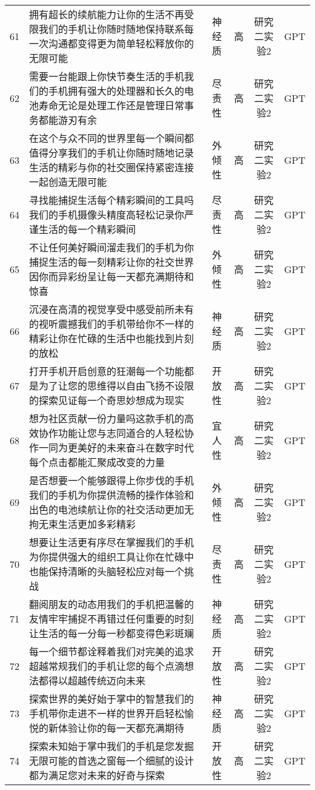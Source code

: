 {\begin{longtable}{c p{8cm} c c c c}
        61 & 拥有超长的续航能力让你的生活不再受限我们的手机让你随时随地保持联系每一次沟通都变得更为简单轻松释放你的无限可能 & 神经质 & 高 & 研究二实验2 & GPT \\
        62 & 需要一台能跟上你快节奏生活的手机我们的手机拥有强大的处理器和长久的电池寿命无论是处理工作还是管理日常事务都能游刃有余 & 尽责性 & 高 & 研究二实验2 & GPT \\
        63 & 在这个与众不同的世界里每一个瞬间都值得分享我们的手机让你随时随地记录生活的精彩与你的社交圈保持紧密连接一起创造无限可能 & 外倾性 & 高 & 研究二实验2 & GPT \\
        64 & 寻找能捕捉生活每个精彩瞬间的工具吗我们的手机摄像头精度高轻松记录你严谨生活的每一个精彩瞬间 & 尽责性 & 高 & 研究二实验2 & GPT \\
        65 & 不让任何美好瞬间溜走我们的手机为你捕捉生活的每一刻精彩让你的社交世界因你而异彩纷呈让每一天都充满期待和惊喜 & 外倾性 & 高 & 研究二实验2 & GPT \\
        66 & 沉浸在高清的视觉享受中感受前所未有的视听震撼我们的手机带给你不一样的精彩让你在忙碌的生活中也能找到片刻的放松 & 神经质 & 高 & 研究二实验2 & GPT \\
        67 & 打开手机开启创意的狂潮每一个功能都是为了让您的思维得以自由飞扬不设限的探索见证每一个奇思妙想成为现实 & 开放性 & 高 & 研究二实验2 & GPT \\
        68 & 想为社区贡献一份力量吗这款手机的高效协作功能让您与志同道合的人轻松协作一同为更美好的未来奋斗在数字时代每个点击都能汇聚成改变的力量 & 宜人性 & 高 & 研究二实验2 & GPT \\
        69 & 是否想要一个能够跟得上你步伐的手机我们的手机为你提供流畅的操作体验和出色的电池续航让你的社交活动更加无拘无束生活更加多彩精彩 & 外倾性 & 高 & 研究二实验2 & GPT \\
        70 & 想要让生活更有序尽在掌握我们的手机为你提供强大的组织工具让你在忙碌中也能保持清晰的头脑轻松应对每一个挑战 & 尽责性 & 高 & 研究二实验2 & GPT \\
        71 & 翻阅朋友的动态用我们的手机把温馨的友情牢牢捕捉不再错过任何重要的时刻让生活的每一分每一秒都变得色彩斑斓 & 神经质 & 高 & 研究二实验2 & GPT \\
        72 & 每一个细节都诠释着我们对完美的追求超越常规我们的手机让您的每个点滴想法都得以超越传统迈向未来 & 开放性 & 高 & 研究二实验2 & GPT \\
        73 & 探索世界的美好始于掌中的智慧我们的手机带你走进不一样的世界开启轻松愉悦的新体验让你的每一天都充满期待 & 神经质 & 高 & 研究二实验2 & GPT \\
        74 & 探索未知始于掌中我们的手机是您发掘无限可能的首选之窗每一个细腻的设计都为满足您对未来的好奇与探索 & 开放性 & 高 & 研究二实验2 & GPT \\

\end{longtable}}
